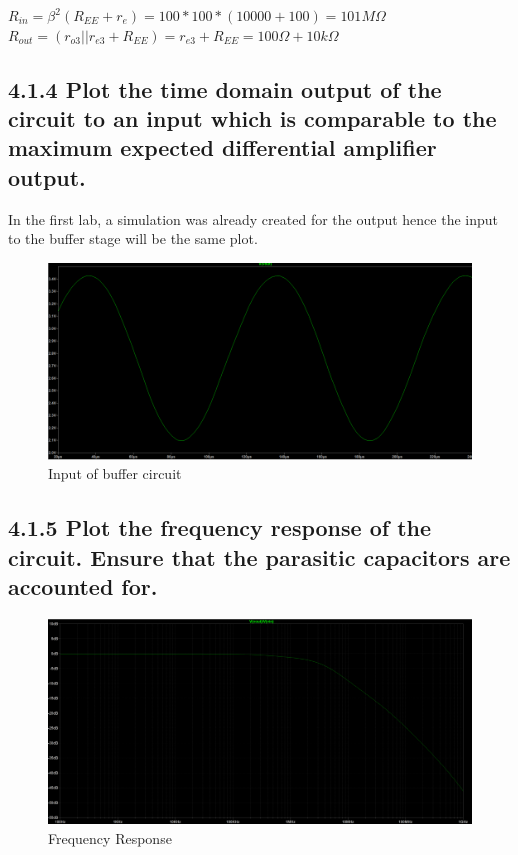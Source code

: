 \documentclass[12pt]{article}
\begin{document}
$R_{in} = \beta^2 (R_{EE} + r_e) = 100 * 100 * (10000 + 100) = 101M \Omega$ \\

$R_{out} = ( r_{o3} || r_{e3} + R_{EE} ) = r_{e3} + R_{EE} = 100 \Omega + 10k \Omega$

\subsection*{4.1.4 Plot the time domain output of the circuit to an input which is comparable to the maximum expected differential amplifier output.}

In the first lab, a simulation was already created for the output hence the input to the buffer stage will be the same plot.

\begin{figure}[H]
\centering
\includegraphics[width=1.0\textwidth]{414.png}
\caption{Input of buffer circuit}
\end{figure}

\subsection*{4.1.5 Plot the frequency response of the circuit. Ensure that the parasitic capacitors are accounted for.}

\begin{figure}[H]
    \centering
    \includegraphics[width=1.0\textwidth]{415.PNG}
    \caption{Frequency Response}
\end{figure}
\end{document}
